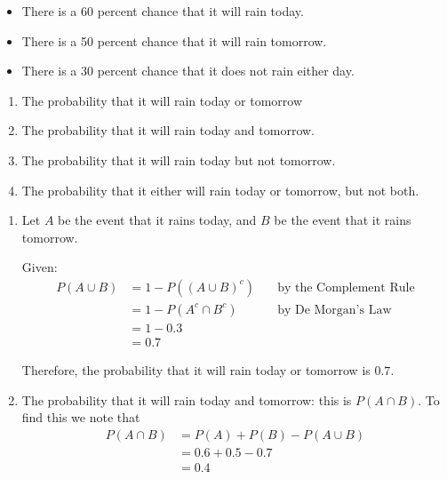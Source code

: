 \begin{example}
    \begin{itemize}
    \item There is a 60 percent chance that it will rain today.
    \item There is a 50 percent chance that it will rain tomorrow.
    \item There is a 30 percent chance that it does not rain either day.
    \end{itemize}
    
\begin{enumerate}[label=(\alph*)]
    \item The probability that it will rain today or tomorrow
    \item The probability that it will rain today and tomorrow.
    \item The probability that it will rain today but not tomorrow.
    \item The probability that it either will rain today or tomorrow, but not both.
\end{enumerate}
    
\begin{solution}
\begin{enumerate}[label=(\alph*)]
    \item     Let \( A \) be the event that it rains today, and \( B \) be the event that it rains tomorrow.
        
    Given:
    \begin{align*}
        P(A \cup B) &= 1 - P\left((A \cup B)^c\right) \quad &\text{by the Complement Rule} \\
                &= 1 - P\left(A^c \cap B^c\right) \quad &\text{by De Morgan's Law} \\
                &= 1 - 0.3 \\
                &= 0.7
    \end{align*}
            
        
    Therefore, the probability that it will rain today or tomorrow is \( 0.7 \).

    \item The probability that it will rain today and tomorrow: this is $P(A \cap B)$. To find this we note that
    \begin{align*}
    P(A \cap B) &= P(A) + P(B) - P(A \cup B) \\
                &= 0.6 + 0.5 - 0.7 \\
                &= 0.4
    \end{align*}


\end{enumerate}
\end{solution}
\end{example}
